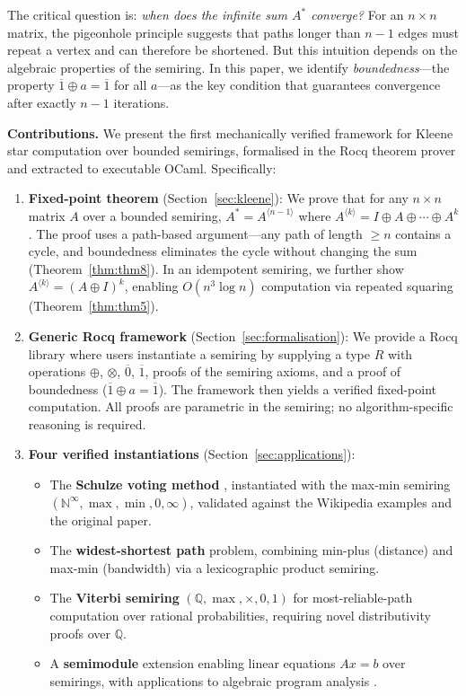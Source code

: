 \documentclass[a4paper,UKenglish,cleveref, autoref, thm-restate, anonymous]{lipics-v2021}
\begin{document}
The critical question is: \emph{when does the infinite sum $A^{*}$ converge?}
For an $n \times n$ matrix, the pigeonhole principle suggests that
paths longer than $n-1$ edges must repeat a vertex and can therefore
be shortened. But this intuition depends on the algebraic properties
of the semiring. In this paper, we identify \emph{boundedness}---the
property $\overline{1} \oplus a = \overline{1}$ for all $a$---as the
key condition that guarantees convergence after exactly $n-1$ iterations.

\textbf{Contributions.} We present the first mechanically verified
framework for Kleene star computation over bounded semirings,
formalised in the Rocq theorem prover and extracted to executable OCaml.
Specifically:

\begin{enumerate}
\item \textbf{Fixed-point theorem} (Section~\ref{sec:kleene}):
We prove that for any $n \times n$ matrix $A$ over a bounded semiring,
$A^{*} = A^{\langle n-1 \rangle}$ where
$A^{\langle k \rangle} = I \oplus A \oplus \cdots \oplus A^{k}$.
The proof uses a path-based argument---any path of length $\geq n$
contains a cycle, and boundedness eliminates the cycle without
changing the sum (Theorem~\ref{thm:thm8}).
In an idempotent semiring, we further show
$A^{\langle k \rangle} = (A \oplus I)^{k}$, enabling $O(n^3 \log n)$
computation via repeated squaring (Theorem~\ref{thm:thm5}).

\item \textbf{Generic Rocq framework} (Section~\ref{sec:formalisation}):
We provide a Rocq library where users instantiate a semiring by
supplying a type $R$ with operations $\oplus$, $\otimes$,
$\overline{0}$, $\overline{1}$, proofs of the semiring axioms, and a
proof of boundedness ($\overline{1} \oplus a = \overline{1}$).
The framework then yields a verified fixed-point computation.
All proofs are parametric in the semiring; no algorithm-specific
reasoning is required.

\item \textbf{Four verified instantiations} (Section~\ref{sec:applications}):
\begin{itemize}
  \item The \textbf{Schulze voting method} \cite{schulze2011new},
    instantiated with the max-min semiring
    $(\mathbb{N}^\infty, \max, \min, 0, \infty)$, validated against
    the Wikipedia examples and the original paper.
  \item The \textbf{widest-shortest path} problem, combining
    min-plus (distance) and max-min (bandwidth) via a lexicographic
    product semiring.
  \item The \textbf{Viterbi semiring} $(\mathbb{Q}, \max, \times, 0, 1)$
    for most-reliable-path computation over rational probabilities,
    requiring novel distributivity proofs over $\mathbb{Q}$.
  \item A \textbf{semimodule} extension enabling linear equations
    $Ax = b$ over semirings, with applications to algebraic program
    analysis \cite{kincaid2021algebraic,esparza2010newtonian}.
\end{itemize}


\end{enumerate}
\end{document}
